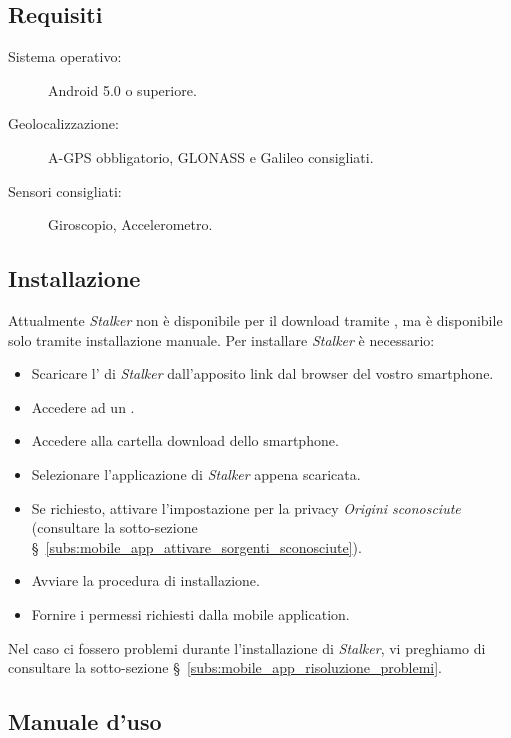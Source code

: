 \documentclass[../manuale-utente.tex]{subfiles}
\begin{document}
\subsection{Requisiti}%
\label{sub:mobile_app_requisiti}

\begin{description}
    \item[Sistema operativo:] Android 5.0 o superiore.
    \item[Geolocalizzazione:] A-GPS obbligatorio, GLONASS e Galileo consigliati.
    \item[Sensori consigliati:] Giroscopio, Accelerometro.
\end{description}

\subsection{Installazione}%
\label{sub:mobile_app_installazione}

Attualmente \textit{Stalker} non è disponibile per il download tramite \textit{}, ma è disponibile solo tramite installazione manuale.
Per installare \textit{Stalker} è necessario:
\begin{itemize}
    \item Scaricare l'\textit{} di \textit{Stalker} dall'apposito link dal browser del vostro smartphone.
    \item Accedere ad un .
    \item Accedere alla cartella download dello smartphone.
    \item Selezionare l'applicazione di \textit{Stalker} appena scaricata.
    \item Se richiesto, attivare l'impostazione per la privacy \textit{Origini sconosciute} (consultare la sotto-sezione §~\ref{subs:mobile_app_attivare_sorgenti_sconosciute}).
    \item Avviare la procedura di installazione.
    \item Fornire i permessi richiesti dalla mobile application.
\end{itemize}
Nel caso ci fossero problemi durante l'installazione di \textit{Stalker}, vi preghiamo di consultare la sotto-sezione §~\ref{subs:mobile_app_risoluzione_problemi}.

\subsection{Manuale d'uso}%
\label{sub:manuale_uso_mobile}
\end{document}
